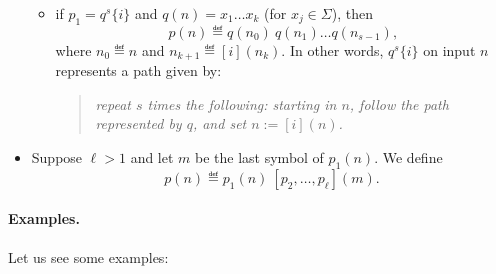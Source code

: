 \begin{itemize}
\begin{itemize}
	\item if $p_1=q^s\{i\}$ and  $q(n)=x_1\dots x_k$ (for $x_j\in\Sigma$), then
	$$
	p(n)\eqdef q(n_0)\ q(n_1)\dots q(n_{s-1}),
	$$
	where $n_0\eqdef n$ and $n_{k+1}\eqdef [i](n_k)$. In other words, $q^s\{ i\}$ on input $n$ represents a path given by:
	\begin{quote}\em
	repeat $s$ times the following:  starting in $n$, follow the path represented by $q$, and set $n:=[i](n)$.
	\end{quote}
	
	
	
	\end{itemize}
	



\item Suppose $\ell>1$ and let $m$ be the last symbol of $p_1(n)$. We define
$$
p(n)\eqdef p_1(n) \ [p_2,\dots,p_\ell](m).
$$

\end{itemize}

\paragraph{Examples.}
Let us see some examples:

